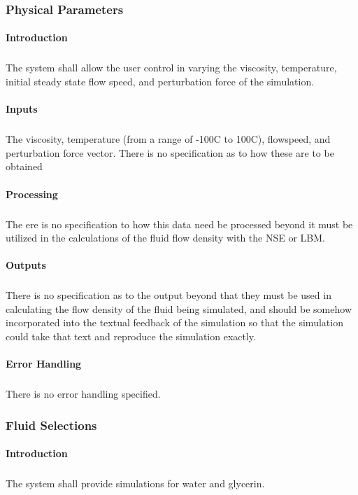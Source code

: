 \documentclass{scrartcl}
\begin{document}
\subsubsection{Physical Parameters}
\paragraph{Introduction}
\subparagraph{}
The system shall allow the user control in varying the viscosity, temperature, initial steady state flow speed, and perturbation force of the simulation. 

\paragraph{Inputs}
\subparagraph{}
The viscosity, temperature (from a range of -100C to 100C), flowspeed, and perturbation force vector. There is no specification as to how these are to be obtained

\paragraph{Processing}
\subparagraph{}
The ere is no specification to how this data need be processed beyond it must be utilized in the calculations of the fluid flow density with the NSE or LBM.

\paragraph{Outputs}
\subparagraph{}
There is no specification as to the output beyond that they must be used in calculating the flow density of the fluid being simulated, and should be somehow incorporated into the textual feedback of the simulation so that the simulation could take that text and reproduce the simulation exactly. 

\paragraph{Error Handling}
\subparagraph{}
There is no error handling specified.



\subsubsection{Fluid Selections}
\paragraph{Introduction}
\subparagraph{}
The system shall provide simulations for water and glycerin.
\end{document}
